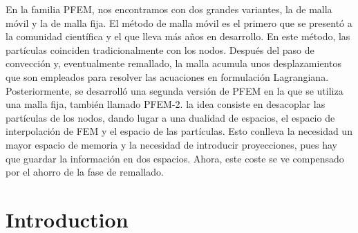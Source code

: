 En la familia PFEM, nos encontramos con dos grandes variantes, la de malla móvil y la de malla fija. El método de malla móvil es el primero que se presentó a la comunidad científica y el que lleva más años en desarrollo. En este método, las partículas coinciden tradicionalmente con los nodos. Después del paso de convección y, eventualmente remallado, la malla acumula unos desplazamientos que son empleados para resolver las acuaciones en formulación Lagrangiana. Posteriormente, se desarrolló una segunda versión de PFEM en la que se utiliza una malla fija, también llamado PFEM-2. la idea consiste en desacoplar las partículas de los nodos, dando lugar a una dualidad de espacios, el espacio de interpolación de FEM y el espacio de las partículas. Esto conlleva la necesidad un mayor espacio de memoria y la necesidad de introducir proyecciones, pues hay que guardar la información en dos espacios. Ahora, este coste se ve compensado por el ahorro de la fase de remallado.


\section{Introduction}

